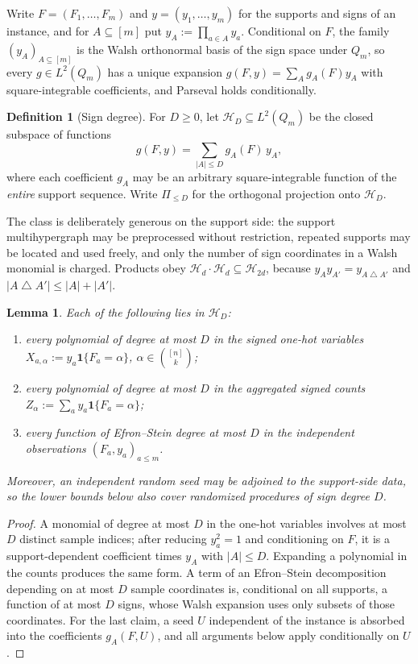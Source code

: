 \documentclass[11pt]{article}
\newtheorem{lemma}[lemma]{Lemma}
\theoremstyle{definition}
\newtheorem{definition}[definition]{Definition}
\theoremstyle{remark}
\newcommand{\1}{\mathbf 1}
\newcommand{\cH}{\mathcal H}
\newcommand{\sd}{\mathbin{\triangle}}
\numberwithin{equation}{section}
\begin{document}
Write $F=(F_1,\ldots,F_m)$ and $y=(y_1,\ldots,y_m)$ for the supports and
signs of an instance, and for $A\subseteq[m]$ put
$y_A:=\prod_{a\in A}y_a$.  Conditional on $F$, the family
$(y_A)_{A\subseteq[m]}$ is the Walsh orthonormal basis of the sign space
under $Q_m$, so every $g\in L^2(Q_m)$ has a unique expansion
$g(F,y)=\sum_Ag_A(F)y_A$ with square-integrable coefficients, and
Parseval holds conditionally.

\begin{definition}[Sign degree]\label{def:sign-degree}
For $D\ge0$, let $\cH_D\subseteq L^2(Q_m)$ be the closed subspace of
functions
\begin{equation}\label{eq:sign-degree}
 g(F,y)=\sum_{|A|\le D}g_A(F)\,y_A ,
\end{equation}
where each coefficient $g_A$ may be an arbitrary square-integrable
function of the \emph{entire} support sequence.  Write $\Pi_{\le D}$ for
the orthogonal projection onto $\cH_D$.
\end{definition}

The class is deliberately generous on the support side: the support
multihypergraph may be preprocessed without restriction, repeated
supports may be located and used freely, and only the number of sign
coordinates in a Walsh monomial is charged.  Products obey
$\cH_d\cdot\cH_d\subseteq\cH_{2d}$, because
$y_Ay_{A'}=y_{A\sd A'}$ and $|A\sd A'|\le|A|+|A'|$.

\begin{lemma}
\label{lem:class-containment}
Each of the following lies in $\cH_D$:
\begin{enumerate}
\item every polynomial of degree at most $D$ in the signed one-hot
variables $X_{a,\alpha}:=y_a\1\{F_a=\alpha\}$,
$\alpha\in\binom{[n]}k$;
\item every polynomial of degree at most $D$ in the aggregated signed
counts $Z_\alpha:=\sum_{a}y_a\1\{F_a=\alpha\}$;
\item every function of Efron--Stein degree at most $D$ in the
independent observations $(F_a,y_a)_{a\le m}$.
\end{enumerate}
Moreover, an independent random seed may be adjoined to the support-side
data, so the lower bounds below also cover randomized procedures of sign
degree $D$.
\end{lemma}
\begin{proof}
A monomial of degree at most $D$ in the one-hot variables involves at
most $D$ distinct sample indices; after reducing $y_a^2=1$ and
conditioning on $F$, it is a support-dependent coefficient times $y_A$
with $|A|\le D$.  Expanding a polynomial in the counts produces the same
form.  A term of an Efron--Stein decomposition depending on at most $D$
sample coordinates is, conditional on all supports, a function of at
most $D$ signs, whose Walsh expansion uses only subsets of those
coordinates.  For the last claim, a seed $U$ independent of the instance
is absorbed into the coefficients $g_A(F,U)$, and all arguments below
apply conditionally on $U$.
\end{proof}
\end{document}
